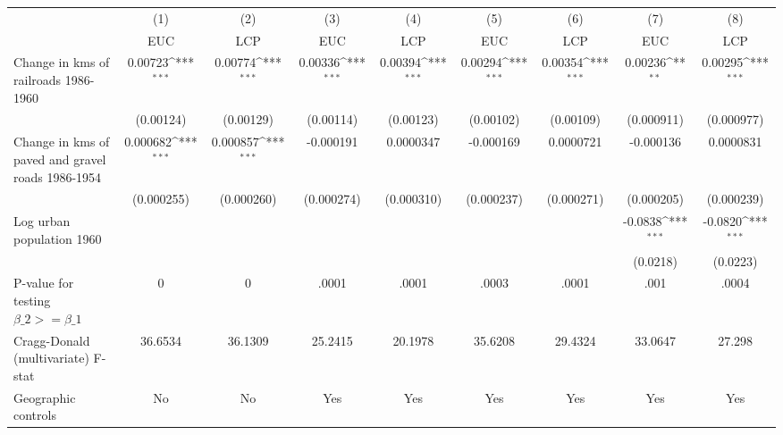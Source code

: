 {
\def\sym#1{\ifmmode^{#1}\else\(^{#1}\)\fi}
\begin{tabular}{l*{8}{c}}
\hline\hline
                &\multicolumn{1}{c}{(1)}&\multicolumn{1}{c}{(2)}&\multicolumn{1}{c}{(3)}&\multicolumn{1}{c}{(4)}&\multicolumn{1}{c}{(5)}&\multicolumn{1}{c}{(6)}&\multicolumn{1}{c}{(7)}&\multicolumn{1}{c}{(8)}\\
                &\multicolumn{1}{c}{EUC}&\multicolumn{1}{c}{LCP}&\multicolumn{1}{c}{EUC}&\multicolumn{1}{c}{LCP}&\multicolumn{1}{c}{EUC}&\multicolumn{1}{c}{LCP}&\multicolumn{1}{c}{EUC}&\multicolumn{1}{c}{LCP}\\
\hline
Change in kms of railroads 1986-1960&  0.00723\sym{***}&  0.00774\sym{***}&  0.00336\sym{***}&  0.00394\sym{***}&  0.00294\sym{***}&  0.00354\sym{***}&  0.00236\sym{**} &  0.00295\sym{***}\\
                &(0.00124)         &(0.00129)         &(0.00114)         &(0.00123)         &(0.00102)         &(0.00109)         &(0.000911)         &(0.000977)         \\
[1em]
Change in kms of paved and gravel roads 1986-1954& 0.000682\sym{***}& 0.000857\sym{***}&-0.000191         &0.0000347         &-0.000169         &0.0000721         &-0.000136         &0.0000831         \\
                &(0.000255)         &(0.000260)         &(0.000274)         &(0.000310)         &(0.000237)         &(0.000271)         &(0.000205)         &(0.000239)         \\
[1em]
Log urban population 1960&                  &                  &                  &                  &                  &                  &  -0.0838\sym{***}&  -0.0820\sym{***}\\
                &                  &                  &                  &                  &                  &                  & (0.0218)         & (0.0223)         \\
\hline
P-value for testing $\beta\_{2} >= \beta\_{1}$&        0         &        0         &    .0001         &    .0001         &    .0003         &    .0001         &     .001         &    .0004         \\
Cragg-Donald (multivariate) F-stat&  36.6534         &  36.1309         &  25.2415         &  20.1978         &  35.6208         &  29.4324         &  33.0647         &   27.298         \\
Geographic controls&       No         &       No         &      Yes         &      Yes         &      Yes         &      Yes         &      Yes         &      Yes         \\

\end{tabular}}
